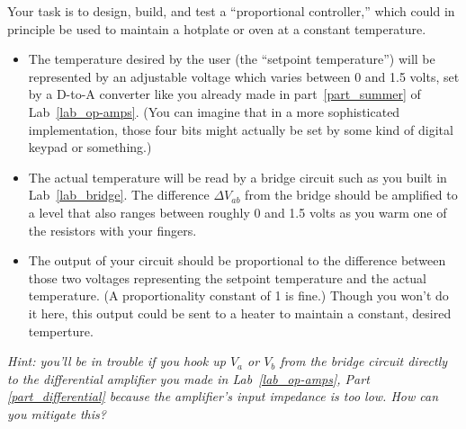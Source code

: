 Your task is to design, build, and test a ``proportional controller,'' which could in principle be used to maintain a hotplate or oven at a constant temperature.
\begin{itemize}[nosep]
\item The temperature desired by the user (the ``setpoint temperature'') will be represented by an adjustable voltage which varies between 0 and 1.5 volts, set by a D-to-A converter like you already made in part~\ref{part_summer} of Lab~\ref{lab_op-amps}.  (You can imagine that in a more sophisticated implementation, those four bits might actually be set by some kind of digital keypad or something.)
\item The actual temperature will be read by a bridge circuit such as you built in Lab~\ref{lab_bridge}.  The difference $\Delta V_{ab}$ from the bridge should be amplified to a level that also ranges between roughly 0 and 1.5 volts as you warm one of the resistors with your fingers.
\item The output of your circuit should be proportional to the difference between those two voltages representing the setpoint temperature and the actual temperature.  (A proportionality constant of 1 is fine.)  Though you won't do it here, this output could be sent to a heater to maintain a constant, desired temperture.  
\end{itemize}
\textit{Hint: you'll be in trouble if you hook up $V_a$ or $V_b$ from the bridge circuit directly to the differential amplifier you made in Lab~\ref{lab_op-amps}, Part \ref{part_differential} because the amplifier's input impedance is too low.  How can you mitigate this?} 

